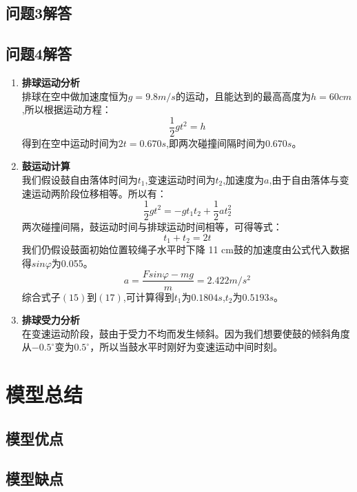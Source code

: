 \documentclass{cumcm}
\begin{document}
\subsection{问题3解答}


\subsection{问题4解答}
\begin{enumerate}
\item \textbf{排球运动分析}\\
排球在空中做加速度恒为$g=9.8m/s$的运动，且能达到的最高高度为$h=60cm$,所以根据运动方程：
\begin{displaymath}
\frac{1}{2}gt^2=h
\end{displaymath}
得到在空中运动时间为$2t=0.670s$,即两次碰撞间隔时间为$0.670s$。
\item\textbf{鼓运动计算}\\
我们假设鼓自由落体时间为$t_1$,变速运动时间为$t_2$,加速度为$a$,由于自由落体与变速运动两阶段位移相等。所以有：
\begin{equation}
\frac{1}{2}gt^2=-gt_1t_2+\frac{1}{2}at_2^2
\end{equation}
两次碰撞间隔，鼓运动时间与排球运动时间相等，可得等式：
\begin{equation}
t_1+t_2=2t
\end{equation}
我们仍假设鼓面初始位置较绳子水平时下降 11 cm鼓的加速度由公式代入数据得$sin\varphi$为0.055。
\begin{equation}
a=\frac{Fsin\varphi-mg}{m}=2.422m/s^2
\end{equation}
综合式子$(15)$到$(17)$,可计算得到$t_1$为$0.1804s$,$t_2$为$0.5193s$。
\item \textbf{排球受力分析}\\
在变速运动阶段，鼓由于受力不均而发生倾斜。因为我们想要使鼓的倾斜角度从$-0.5^{\circ}$变为$0.5^{\circ}$，所以当鼓水平时刚好为变速运动中间时刻。
\end{enumerate}
\section{模型总结}

\subsection{模型优点}

\subsection{模型缺点}
\end{document}
